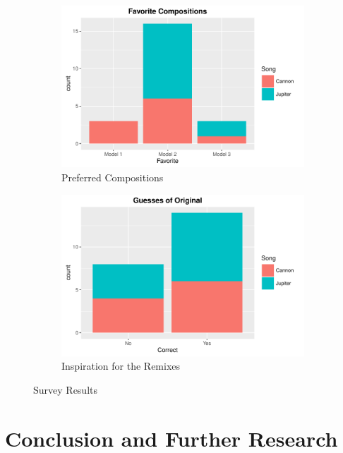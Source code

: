 \documentclass{article} %
\begin{document}
\begin{figure}
\centering
\begin{subfigure}{.5\textwidth}
  \centering
  \includegraphics[scale = 0.5]{SurveyFav.pdf}
  \caption{Preferred Compositions\label{survey1}}
  \label{fig:sub1}
\end{subfigure}%
\begin{subfigure}{.5\textwidth}
  \centering
  \includegraphics[scale = 0.5]{SurveyGuesses.pdf}
  \caption{Inspiration for the Remixes\label{survey2}}
  \label{fig:sub2}
\end{subfigure}
\caption{Survey Results}
\label{fig:test}
\end{figure}




\section{Conclusion and Further Research}
\end{document}
